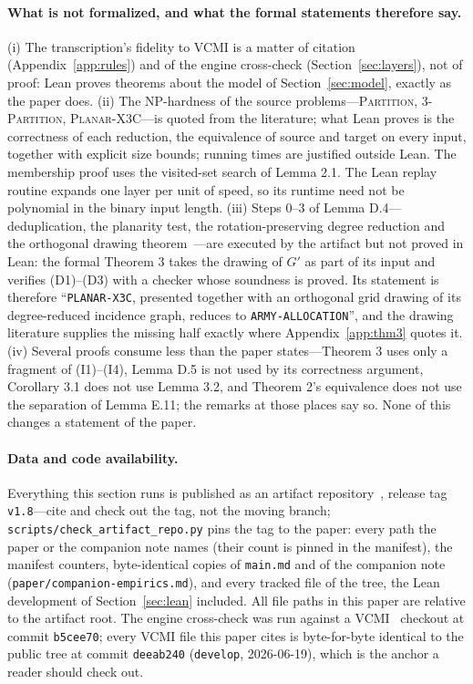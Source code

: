 \documentclass[11pt,a4paper]{article}
\theoremstyle{plain}
\theoremstyle{definition}
\theoremstyle{plain}
\theoremstyle{definition}
\theoremstyle{remark}
\newcommand{\src}[1]{\texttt{#1}}
\begin{document}
\paragraph{What is not formalized, and what the formal statements therefore say.} (i) The
transcription's fidelity to VCMI is a matter of citation (Appendix~\ref{app:rules}) and of
the engine cross-check (Section~\ref{sec:layers}), not of proof: Lean proves theorems about
the model of Section~\ref{sec:model}, exactly as the paper does. (ii) The NP-hardness of
the source problems---\textsc{Partition}, \textsc{3-Partition},
\textsc{Planar-X3C}---is quoted from the literature; what Lean proves is the correctness of
each reduction, the equivalence of source and target on every input, together with explicit
size bounds; running times are justified outside Lean. The membership proof uses the visited-set search of Lemma 2.1. The Lean replay routine expands one layer per unit of speed, so its runtime need not be polynomial in the binary input length. (iii) Steps
0--3 of Lemma D.4---deduplication, the planarity test, the rotation-preserving degree
reduction and the orthogonal drawing theorem~\cite{TT89,DG13}---are executed by the artifact
but not proved in Lean: the formal Theorem 3 takes the drawing of $G'$ as part of its input
and verifies (D1)--(D3) with a checker whose soundness is proved. Its statement is
therefore ``\src{PLANAR-X3C}, presented together with an orthogonal grid drawing of its
degree-reduced incidence graph, reduces to \src{ARMY-ALLOCATION}'', and the drawing
literature supplies the missing half exactly where Appendix~\ref{app:thm3} quotes it. (iv)
Several proofs consume less than the paper states---Theorem 3 uses only a fragment of
(I1)--(I4), Lemma D.5 is not used by its correctness argument, Corollary 3.1 does not use
Lemma 3.2, and Theorem 2's equivalence does not use the separation of Lemma E.11; the
remarks at those places say so. None of this changes a statement of the paper.

\paragraph{Data and code availability.}
Everything this section runs is published as an artifact repository~\cite{Par26}, release
tag \src{v1.8}---cite and check out the tag, not the moving branch;
\src{scripts/check\_\allowbreak artifact\_\allowbreak repo.py} pins the tag to the paper: every
path the paper or the companion note names (their count is pinned in the manifest), the
manifest counters, byte-identical copies of \src{main.md} and of the companion note
(\src{paper/companion-\allowbreak empirics.md}), and every tracked file of the tree, the Lean
development of Section~\ref{sec:lean} included. All file paths in this paper are relative to the
artifact root. The engine cross-check was run against a VCMI~\cite{VCMI26} checkout at
commit \src{b5cee70}; every VCMI file this paper cites is byte-for-byte identical to the
public tree at commit \src{deeab240} (\src{develop}, 2026-06-19), which is the anchor a
reader should check out.
\end{document}
